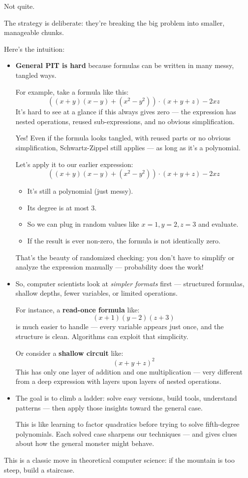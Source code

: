 Not quite.

The strategy is deliberate: they’re breaking the big problem into smaller, manageable chunks.

Here’s the intuition:

\begin{itemize}
  \item \textbf{General PIT is hard} because formulas can be written in many messy, tangled ways.

  For example, take a formula like this:
  \[
    ((x + y)(x - y) + (x^2 - y^2)) \cdot (x + y + z) - 2xz
  \]
  It’s hard to see at a glance if this always gives zero — the expression has nested operations, reused sub-expressions, and no obvious simplification.

  \begin{tcolorbox}[title=Wait — can Schwartz-Zippel handle messy expressions too?, colback=gray!5!white, colframe=black!75!white]
Yes! Even if the formula looks tangled, with reused parts or no obvious simplification, Schwartz-Zippel still applies — as long as it's a polynomial.

\medskip

Let’s apply it to our earlier expression:
\[
((x + y)(x - y) + (x^2 - y^2)) \cdot (x + y + z) - 2xz
\]

\begin{itemize}
  \item It's still a polynomial (just messy).
  \item Its degree is at most 3.
  \item So we can plug in random values like \(x = 1, y = 2, z = 3\) and evaluate.
  \item If the result is ever non-zero, the formula is not identically zero.
\end{itemize}

That’s the beauty of randomized checking: you don’t have to simplify or analyze the expression manually — probability does the work!
\end{tcolorbox}


  \item So, computer scientists look at \textit{simpler formats} first — structured formulas, shallow depths, fewer variables, or limited operations.

  For instance, a \textbf{read-once formula} like:
  \[
    (x + 1)(y - 2)(z + 3)
  \]
  is much easier to handle — every variable appears just once, and the structure is clean. Algorithms can exploit that simplicity.

  Or consider a \textbf{shallow circuit} like:
  \[
    (x + y + z)^2
  \]
  This has only one layer of addition and one multiplication — very different from a deep expression with layers upon layers of nested operations.

  \item The goal is to climb a ladder: solve easy versions, build tools, understand patterns — then apply those insights toward the general case.

  This is like learning to factor quadratics before trying to solve fifth-degree polynomials. Each solved case sharpens our techniques — and gives clues about how the general monster might behave.
\end{itemize}


This is a classic move in theoretical computer science: if the mountain is too steep, build a staircase.

\vspace{1em}
